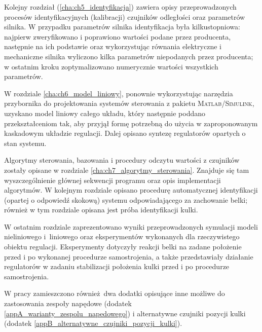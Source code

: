 Kolejny rozdział (\ref{cha:ch5_identyfikacja}) zawiera opisy przeprowadzonych procesów identyfikacyjnych (kalibracji) czujników odległości oraz parametrów silnika. W przypadku parametrów silnika identyfikacja była kilkustopniowa: najpierw zweryfikowano i poprawiono wartości podane przez producenta, następnie na ich podstawie oraz wykorzystując równania elektryczne i mechaniczne silnika wyliczono kilka parametrów niepodanych przez producenta; w ostatnim kroku zoptymalizowano numerycznie wartości wszystkich parametrów.

W rozdziale \ref{cha:ch6_model_liniowy}, ponownie wykorzystując narzędzia przybornika do projektowania systemów sterowania z pakietu \textsc{Matlab/Simulink}, uzyskano model liniowy całego układu, który następnie poddano przekształceniom tak, aby przyjął formę potrzebną do użycia w zaproponowanym kaskadowym układzie regulacji. Dalej opisano syntezę regulatorów opartych o stan systemu.

Algorytmy sterowania, bazowania i procedury odczytu wartości z czujników zostały opisane w rozdziale \ref{cha:ch7_algorytmy_sterowania}. Znajduje się tam wyszczególnienie głównej sekwencji programu oraz opis implementacji algorytmów. W kolejnym rozdziale opisano procedurę automatycznej identyfikacji (opartej o odpowiedź skokową) systemu odpowiadającego za zachowanie belki; również w tym rozdziale opisana jest próba identyfikacji kulki.

W ostatnim rozdziale zaprezentowano wyniki przeprowadzonych symulacji modeli nieliniowego i~liniowego oraz eksperymentów wykonanych dla rzeczywistego obiektu regulacji. Eksperymenty dotyczyły reakcji belki na zadane położenie przed i po wykonanej procedurze samostrojenia, a także przedstawiały działanie regulatorów w zadaniu stabilizacji położenia kulki przed i po procedurze samo\-strojenia.

W pracy zamieszczono również dwa dodatki opisujące inne możliwe do zastosowania zespoły napędowe (dodatek \ref{appA_warianty_zespolu_napedowego}) i alternatywne czujniki pozycji kulki (dodatek \ref{appB_alternatywne_czujniki_pozycji_kulki}).


